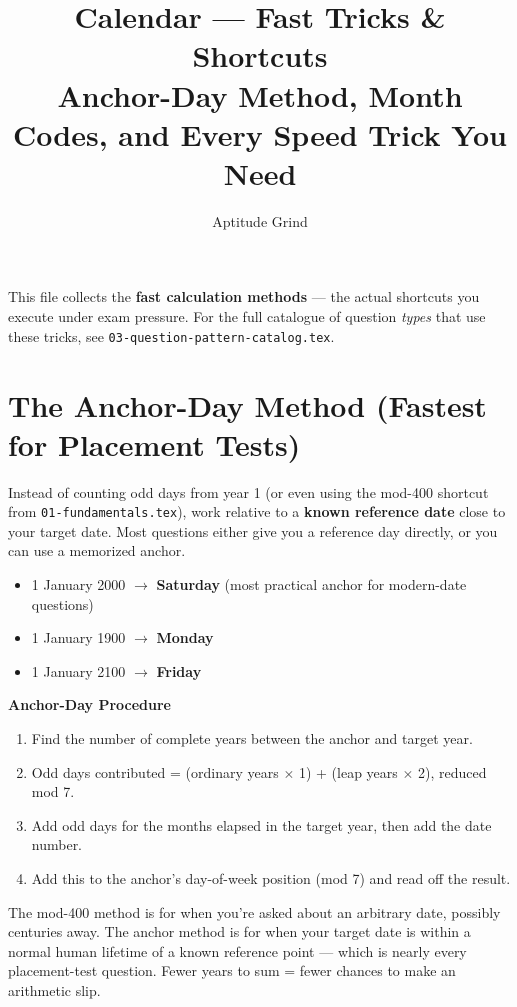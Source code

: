 \documentclass[11pt]{article}
\title{\color{primary}\textbf{Calendar --- Fast Tricks \& Shortcuts}\\[4pt]\large Anchor-Day Method, Month Codes, and Every Speed Trick You Need}
\author{Aptitude Grind}
\date{}
\begin{document}
\maketitle
\thispagestyle{fancy}

This file collects the \textbf{fast calculation methods} --- the actual shortcuts you execute under
exam pressure. For the full catalogue of question \emph{types} that use these tricks, see
\texttt{03-question-pattern-catalog.tex}.

\section{The Anchor-Day Method (Fastest for Placement Tests)}

Instead of counting odd days from year 1 (or even using the mod-400 shortcut from
\texttt{01-fundamentals.tex}), work relative to a \textbf{known reference date} close to your target
date. Most questions either give you a reference day directly, or you can use a memorized anchor.

\begin{formulabox}
\begin{itemize}[leftmargin=1.4em]
  \item 1 January 2000 $\to$ \textbf{Saturday} (most practical anchor for modern-date questions)
  \item 1 January 1900 $\to$ \textbf{Monday}
  \item 1 January 2100 $\to$ \textbf{Friday}
\end{itemize}
\end{formulabox}

\textbf{Anchor-Day Procedure}
\begin{enumerate}[leftmargin=1.6em]
  \item Find the number of complete years between the anchor and target year.
  \item Odd days contributed = (ordinary years $\times$ 1) + (leap years $\times$ 2), reduced mod 7.
  \item Add odd days for the months elapsed in the target year, then add the date number.
  \item Add this to the anchor's day-of-week position (mod 7) and read off the result.
\end{enumerate}

\begin{tipbox}
The mod-400 method is for when you're asked about an arbitrary date, possibly centuries away. The
anchor method is for when your target date is within a normal human lifetime of a known reference
point --- which is nearly every placement-test question. Fewer years to sum = fewer chances to make
an arithmetic slip.
\end{tipbox}
\end{document}
